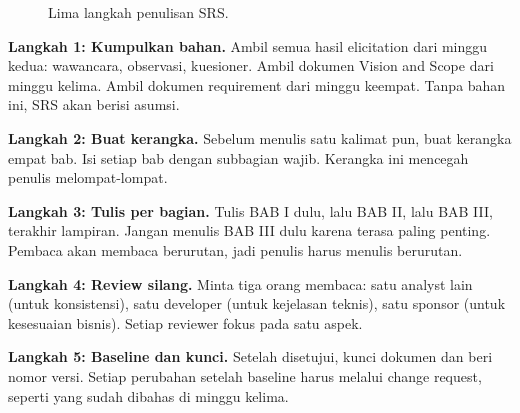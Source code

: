 \documentclass[11pt,a4paper]{article}
\begin{document}
\begin{figure}[H]
	\centering
	\caption{Lima langkah penulisan SRS.}
	\label{fig:writing-flow}
\end{figure}

\textbf{Langkah 1: Kumpulkan bahan.} Ambil semua hasil elicitation dari minggu kedua: wawancara, observasi, kuesioner. Ambil dokumen Vision and Scope dari minggu kelima. Ambil dokumen requirement dari minggu keempat. Tanpa bahan ini, SRS akan berisi asumsi.

\textbf{Langkah 2: Buat kerangka.} Sebelum menulis satu kalimat pun, buat kerangka empat bab. Isi setiap bab dengan subbagian wajib. Kerangka ini mencegah penulis melompat-lompat.

\textbf{Langkah 3: Tulis per bagian.} Tulis BAB I dulu, lalu BAB II, lalu BAB III, terakhir lampiran. Jangan menulis BAB III dulu karena terasa paling penting. Pembaca akan membaca berurutan, jadi penulis harus menulis berurutan.

\textbf{Langkah 4: Review silang.} Minta tiga orang membaca: satu analyst lain (untuk konsistensi), satu developer (untuk kejelasan teknis), satu sponsor (untuk kesesuaian bisnis). Setiap reviewer fokus pada satu aspek.

\textbf{Langkah 5: Baseline dan kunci.} Setelah disetujui, kunci dokumen dan beri nomor versi. Setiap perubahan setelah baseline harus melalui change request, seperti yang sudah dibahas di minggu kelima.
\end{document}
